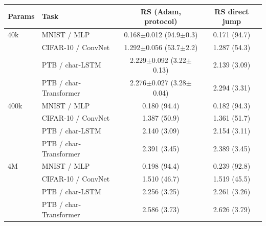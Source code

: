 \begin{tabular}{l l cc}
\toprule
Params & Task & RS (Adam, protocol) & RS direct jump \\
\midrule
40k & MNIST / MLP & 0.168$\pm$0.012 (94.9$\pm$0.3) & 0.171 (94.7) \\
 & CIFAR-10 / ConvNet & 1.292$\pm$0.056 (53.7$\pm$2.2) & 1.287 (54.3) \\
 & PTB / char-LSTM & 2.229$\pm$0.092 (3.22$\pm$0.13) & 2.139 (3.09) \\
 & PTB / char-Transformer & 2.276$\pm$0.027 (3.28$\pm$0.04) & 2.294 (3.31) \\
\midrule
400k & MNIST / MLP & 0.180 (94.4) & 0.182 (94.3) \\
 & CIFAR-10 / ConvNet & 1.387 (50.9) & 1.361 (51.7) \\
 & PTB / char-LSTM & 2.140 (3.09) & 2.154 (3.11) \\
 & PTB / char-Transformer & 2.391 (3.45) & 2.389 (3.45) \\
\midrule
4M & MNIST / MLP & 0.198 (94.4) & 0.239 (92.8) \\
 & CIFAR-10 / ConvNet & 1.510 (46.7) & 1.519 (45.5) \\
 & PTB / char-LSTM & 2.256 (3.25) & 2.261 (3.26) \\
 & PTB / char-Transformer & 2.586 (3.73) & 2.626 (3.79) \\
\bottomrule
\end{tabular}
